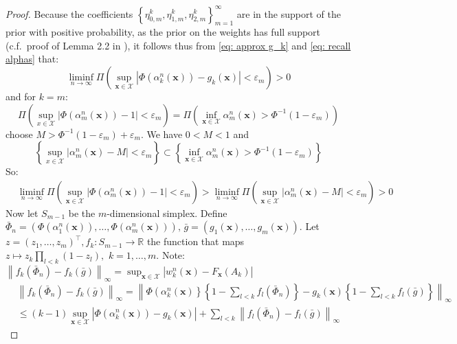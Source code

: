 \begin{proof}
Because the coefficients $\left\{{ } \eta_{0,m}^k, { } \eta_{1, m}^k, { } \eta_{2, m}^k\right\}_{m=1}^{\infty}$ are in the support of the prior with positive probability, as the prior on the weights has full support (c.f.\ proof of Lemma 2.2 in \cite{4}), it follows thus from \eqref{eq: approx g_k} and \eqref{eq: recall alphas} that: 
$$
\liminf_{n\rightarrow\infty}\Pi\left(\sup_{\boldsymbol{x} \in \mathcal{X}} \left|\Phi(\alpha_k^n(\boldsymbol{x}))-g_k(\boldsymbol{x})\right|<\varepsilon_m \right)>0
$$
and for $k=m$:
$$
\Pi\left(\sup _{x \in \mathcal{X}}\left|\Phi\left(\alpha_m^n(\boldsymbol{x})\right)-1\right|<\varepsilon_m\right)=\Pi\left(\inf _{\boldsymbol{x} \in \mathcal{X}} \alpha_m^n(\boldsymbol{x})>\Phi^{-1}\left(1-\varepsilon_m\right)\right)
$$
choose $M>\Phi^{-1}\left(1-\varepsilon_m\right)+\varepsilon_m$. We have $0<M<1$ and
$$
\left\{\sup_{x \in \mathcal{X}} \left|\alpha_m^n(\boldsymbol{x})-M\right|<\varepsilon_m\right\} \subset \left\{ \inf _{\boldsymbol{x} \in \mathcal{X}} \alpha_m^n(\boldsymbol{x})>\Phi^{-1}\left(1-\varepsilon_m\right)\right\}
$$
So: 
$$
\begin{aligned}
&\liminf _{n \rightarrow \infty} \Pi\left(\sup _{\boldsymbol{x} \in \mathcal{X}}\left|\Phi\left(\alpha_m^n(\boldsymbol{x})\right)-1\right|<\varepsilon_m\right) >\liminf _{n \rightarrow \infty} \Pi\left(\sup_{\boldsymbol{x} \in \mathcal{X}} \left|\alpha_m^n(\boldsymbol{x})-M\right|<\varepsilon_m\right)>0
\end{aligned}
$$
Now let $S_{m-1}$ be the $m$-dimensional simplex. Define
$\bar{\Phi}_n=\left(\Phi\left(\alpha_1^n(\boldsymbol{x})\right), \ldots, \Phi\left(\alpha_m^n(\boldsymbol{x})\right)\right), \, \bar{g}=\left(g_1(\boldsymbol{x}), \ldots, g_m(\boldsymbol{x})\right)$. Let $z=\left(z_1, \ldots, z_m\right)^{\top}, f_k: S_{m-1} \rightarrow \mathbb{R}$ the function that maps $
z \mapsto z_k \prod_{l<k}\left(1-z_l\right), \, \, k=1, \ldots, m
$. Note: $\left\|f_k\left(\bar{\Phi}_n\right)-f_k(\bar{g})\right\|_{\infty}=\sup_{\boldsymbol{x} \in \mathcal{X}} \left|w_k^n(\boldsymbol{x})-F_{\boldsymbol{x}}\left(A_k \right)\right| $
$$
\begin{aligned}
& \left\|f_k\left(\bar{\Phi}_n\right)-f_k(\bar{g})\right\|_{\infty}=\left\|\Phi\left(\alpha_k^n(\boldsymbol{x})\right\}\left\{1-\sum_{l<k} f_l\left(\bar{\Phi}_n\right)\right\}-g_k(\boldsymbol{x})\left\{ 1- \sum_{l<k} f_l(\bar{g})\right\}\right\|_{\infty} \\
& \leqslant(k-1) \sup_{\boldsymbol{x} \in \mathcal{X}} \left|\Phi\left(\alpha_k^n(\boldsymbol{x})\right)-g_k(\boldsymbol{x})\right| +\sum_{l<k}\left\|f_l\left(\bar{\Phi}_n\right)-f_l(\bar{g})\right\|_{\infty}

\end{aligned}$$
\end{proof}
